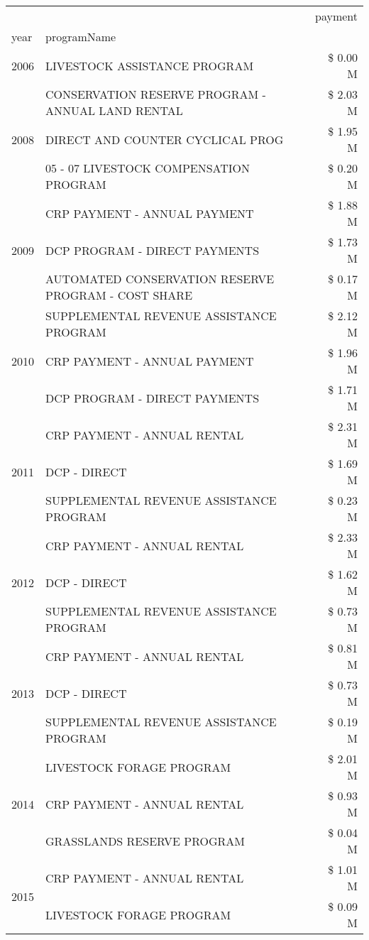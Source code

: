 \begin{tabular}{llr}
\toprule
 &  & payment \\
year & programName &  \\
\midrule
2006 & LIVESTOCK ASSISTANCE PROGRAM & \$ 0.00 M \\
\cline{1-3}
\multirow[t]{3}{*}{2008} & CONSERVATION RESERVE PROGRAM - ANNUAL LAND RENTAL & \$ 2.03 M \\
 & DIRECT AND COUNTER CYCLICAL PROG & \$ 1.95 M \\
 & 05 - 07 LIVESTOCK COMPENSATION PROGRAM & \$ 0.20 M \\
\cline{1-3}
\multirow[t]{3}{*}{2009} & CRP PAYMENT - ANNUAL PAYMENT & \$ 1.88 M \\
 & DCP PROGRAM - DIRECT PAYMENTS & \$ 1.73 M \\
 & AUTOMATED CONSERVATION RESERVE PROGRAM - COST SHARE & \$ 0.17 M \\
\cline{1-3}
\multirow[t]{3}{*}{2010} & SUPPLEMENTAL REVENUE ASSISTANCE PROGRAM & \$ 2.12 M \\
 & CRP PAYMENT - ANNUAL PAYMENT & \$ 1.96 M \\
 & DCP PROGRAM - DIRECT PAYMENTS & \$ 1.71 M \\
\cline{1-3}
\multirow[t]{3}{*}{2011} & CRP PAYMENT - ANNUAL RENTAL & \$ 2.31 M \\
 & DCP - DIRECT & \$ 1.69 M \\
 & SUPPLEMENTAL REVENUE ASSISTANCE PROGRAM & \$ 0.23 M \\
\cline{1-3}
\multirow[t]{3}{*}{2012} & CRP PAYMENT - ANNUAL RENTAL & \$ 2.33 M \\
 & DCP - DIRECT & \$ 1.62 M \\
 & SUPPLEMENTAL REVENUE ASSISTANCE PROGRAM & \$ 0.73 M \\
\cline{1-3}
\multirow[t]{3}{*}{2013} & CRP PAYMENT - ANNUAL RENTAL & \$ 0.81 M \\
 & DCP - DIRECT & \$ 0.73 M \\
 & SUPPLEMENTAL REVENUE ASSISTANCE PROGRAM & \$ 0.19 M \\
\cline{1-3}
\multirow[t]{3}{*}{2014} & LIVESTOCK FORAGE PROGRAM & \$ 2.01 M \\
 & CRP PAYMENT - ANNUAL RENTAL & \$ 0.93 M \\
 & GRASSLANDS RESERVE PROGRAM & \$ 0.04 M \\
\cline{1-3}
\multirow[t]{3}{*}{2015} & CRP PAYMENT - ANNUAL RENTAL & \$ 1.01 M \\
 & LIVESTOCK FORAGE PROGRAM & \$ 0.09 M \\

\end{tabular}
